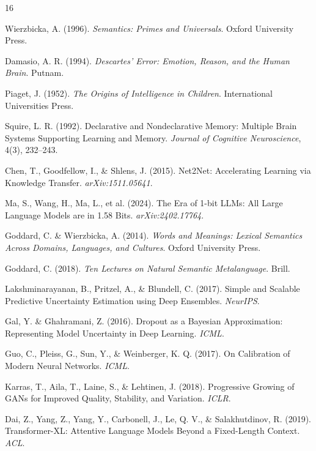 \documentclass{article}
\begin{document}
\begin{thebibliography}{16}

Wierzbicka, A. (1996). \textit{Semantics: Primes and Universals}. Oxford University Press.

Damasio, A. R. (1994). \textit{Descartes' Error: Emotion, Reason, and the Human Brain}. Putnam.

Piaget, J. (1952). \textit{The Origins of Intelligence in Children}. International Universities Press.

Squire, L. R. (1992). Declarative and Nondeclarative Memory: Multiple Brain Systems Supporting Learning and Memory. \textit{Journal of Cognitive Neuroscience}, 4(3), 232–243.

Chen, T., Goodfellow, I., \& Shlens, J. (2015). Net2Net: Accelerating Learning via Knowledge Transfer. \textit{arXiv:1511.05641}.

Ma, S., Wang, H., Ma, L., et al. (2024). The Era of 1-bit LLMs: All Large Language Models are in 1.58 Bits. \textit{arXiv:2402.17764}.

Goddard, C. \& Wierzbicka, A. (2014). \textit{Words and Meanings: Lexical Semantics Across Domains, Languages, and Cultures}. Oxford University Press.

Goddard, C. (2018). \textit{Ten Lectures on Natural Semantic Metalanguage}. Brill.

Lakshminarayanan, B., Pritzel, A., \& Blundell, C. (2017). Simple and Scalable Predictive Uncertainty Estimation using Deep Ensembles. \textit{NeurIPS}.

Gal, Y. \& Ghahramani, Z. (2016). Dropout as a Bayesian Approximation: Representing Model Uncertainty in Deep Learning. \textit{ICML}.

Guo, C., Pleiss, G., Sun, Y., \& Weinberger, K. Q. (2017). On Calibration of Modern Neural Networks. \textit{ICML}.

Karras, T., Aila, T., Laine, S., \& Lehtinen, J. (2018). Progressive Growing of GANs for Improved Quality, Stability, and Variation. \textit{ICLR}.

Dai, Z., Yang, Z., Yang, Y., Carbonell, J., Le, Q. V., \& Salakhutdinov, R. (2019). Transformer-XL: Attentive Language Models Beyond a Fixed-Length Context. \textit{ACL}.


\end{thebibliography}
\end{document}
